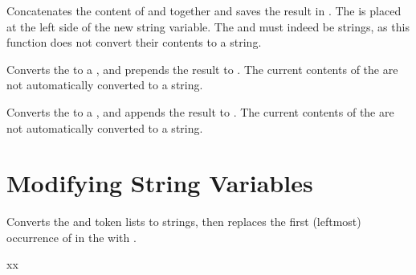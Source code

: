 \documentclass[oneside]{book}
\begin{document}
\begin{function}{\StrConcat}
\begin{syntax}
   
\end{syntax}
Concatenates the content of  and 
together and saves the result in . The 
is placed at the left side of the new string variable.
The  and  must indeed be strings, as
this function does not convert their contents to a string.
\begin{demohigh}
\StrSet {}
\StrSet {}
\StrConcat \lTmpaStr \lTmpbStr \lTmpcStr
\StrUse \lTmpaStr
\end{demohigh}
\end{function}

\begin{function}{\StrPutLeft}
\begin{syntax}
  
\end{syntax}
Converts the  to a , and prepends the
result to .  The current contents of the  are not automatically converted to a string.
\begin{demohigh}
\StrSet {}
\StrPutLeft {}
\StrUse \lTmpkStr
\end{demohigh}
\end{function}

\begin{function}{\StrPutRight}
\begin{syntax}
  
\end{syntax}
Converts the  to a , and appends the
result to .  The current contents of the  are not automatically converted to a string.
\begin{demohigh}
\StrSet {}
\StrPutRight {}
\StrUse \lTmpkStr
\end{demohigh}
\end{function}

\section{Modifying String Variables}

\begin{function}{\StrVarReplaceOnce}
\begin{syntax}
   
\end{syntax}
Converts the  and  token lists to strings, then
replaces the first (leftmost) occurrence of  in the
 with .
\begin{demohigh}
\StrSet {}
\StrVarReplaceOnce {} {xx}
\StrUse \lTmpaStr
\end{demohigh}
\end{function}
\end{document}
